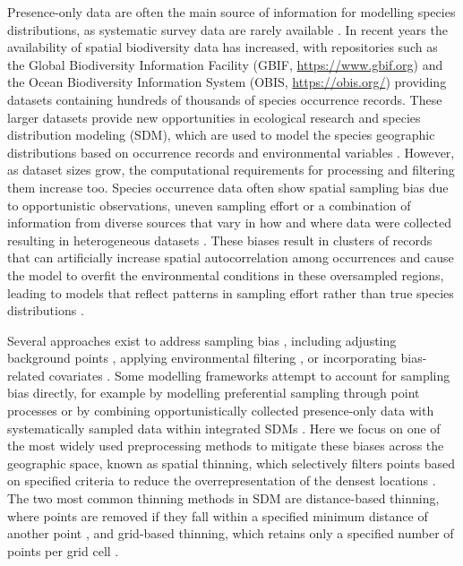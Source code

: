 Presence-only data are often the main source of information for modelling species distributions, as systematic survey data are rarely available \citep{pearce2006modelling}. In recent years the availability of spatial biodiversity data has increased, with repositories such as the Global Biodiversity Information Facility (GBIF, \url{https://www.gbif.org}) and the Ocean Biodiversity Information System (OBIS, \url{https://obis.org/}) providing datasets containing hundreds of thousands of species occurrence records. These larger datasets provide new opportunities in ecological research and species distribution modeling (SDM), which are used to model the species geographic distributions based on occurrence records and environmental variables \citep{pulliam2000relationship, elith2009species, miller2010species, guisan2013predicting}. However, as dataset sizes grow, the computational requirements for processing and filtering them increase too. Species occurrence data often show spatial sampling bias due to opportunistic observations, uneven sampling effort or a combination of information from diverse sources that vary in how and where data were collected resulting in heterogeneous datasets \citep{boakes2010distorted, lobo2011exploring, beck2014spatial, meyer2016range, hughes2021sampling}. These biases result in clusters of records that can artificially increase spatial autocorrelation among occurrences and cause the model to overfit the environmental conditions in these oversampled regions, leading to models that reflect patterns in sampling effort rather than true species distributions \citep{wisz2008effects, phillips2009sample, higa2015mapping, cosentino2021geographic, steen2021spatial}.

Several approaches exist to address sampling bias \citep{inman2021comparing, baker2024effective, moudry2024optimising}, including adjusting background points \citep{barber2022target, vollering2019bunching}, applying environmental filtering \citep{castellanos2019environmental}, or incorporating bias-related covariates \citep{varela2014environmental, chauvier2021novel}. Some modelling frameworks attempt to account for sampling bias directly, for example by modelling preferential sampling through point processes \citep{diggle2010geostatistical, pennino2019accounting, amaral2024model} or by combining opportunistically collected presence-only data with systematically sampled data within integrated SDMs \citep{koshkina2017integrated, simmonds2020more, makinen2024integrated}. Here we focus on one of the most widely used preprocessing methods to mitigate these biases across the geographic space, known as spatial thinning, which selectively filters points based on specified criteria to reduce the overrepresentation of the densest locations \citep{veloz2009spatially, boria2014spatial}. The two most common thinning methods in SDM are distance-based thinning, where points are removed if they fall within a specified minimum distance of another point \citep{aiello2015spthin}, and grid-based thinning, which retains only a specified number of points per grid cell \citep{dismoRpackage}.


